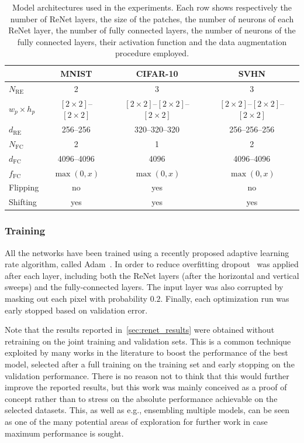 \begin{table}[t]
    \centering
    \begin{tabular}{l || c | c | c }
        & MNIST & CIFAR-10 & SVHN \\
        \hline
        \hline
    $N_{\text{RE}}$ & 2 & 3 & 3 \\
        \hline
        $w_p \times h_p$ & $[2\times 2]$--$[2 \times 2]$ & $[2\times 2]$--$[2 \times 2]$--$[2
        \times 2]$ & $[2\times 2]$--$[2 \times 2]$--$[2 \times 2]$ \\
        \hline
    $d_{\text{RE}}$ & 256--256 & 320--320--320 & 256--256--256 \\
        \hline
    $N_{\text{FC}}$ & 2 & 1 & 2 \\
        \hline
    $d_{\text{FC}}$ & 4096--4096 & 4096 & 4096--4096 \\
        \hline
    $f_{\text{FC}}$ & $\max(0, x)$ & $\max(0,x)$ & $\max(0,x)$ \\
        \hline
    Flipping & no & yes & no \\
        \hline
    Shifting & yes & yes & yes \\
    \end{tabular}
    \caption{Model architectures used in the experiments. Each row shows
             respectively the number of ReNet layers, the size of the patches,
             the number of neurons of each ReNet layer, the number of fully
             connected layers, the number of neurons of the fully connected
             layers, their activation function and the data augmentation
             procedure employed.}
    \label{tbl:renet_architectures}
\end{table}

\subsubsection{Training}
All the networks have been trained using a recently proposed adaptive learning
rate algorithm, called Adam~\citep{Kingma2014}. In order to reduce overfitting
dropout~\citep{Srivastava14} was applied after each layer, including both the
ReNet layers (after the horizontal and vertical sweeps) and the fully-connected
layers. The input layer was also corrupted by masking out each pixel with
probability $0.2$. Finally, each optimization run was early stopped based
on validation error.

Note that the results reported in~\autoref{sec:renet_results} were obtained
without retraining on the joint training and validation sets. This is a common
technique exploited by many works in the literature to boost the performance
of the best model, selected after a full training on the training set and early
stopping on the validation performance. There is no reason not to think that
this would further improve the reported results, but this work was mainly
conceived as a proof of concept rather than to stress on the absolute
performance achievable on the selected datasets. This, as well as e.g.,
ensembling multiple models, can be seen as one of the many potential areas of
exploration for further work in case maximum performance is sought.

